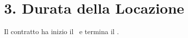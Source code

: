 \section*{3. Durata della Locazione}
Il contratto ha inizio il \Rentstartdate\ e termina il \Rentenddate.
